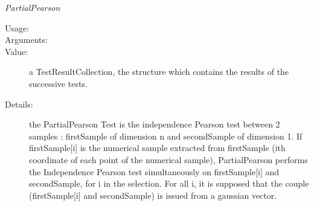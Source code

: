 \begin{description}
\begin{description}
\item \textit{PartialPearson}
\begin{description}
\item[Usage:] \rule{0pt}{1em}
\item[Arguments:] \rule{0pt}{1em}
\item[Value:]  a TestResultCollection, the structure which contains the results of the successive tests.
\item[Details:] the PartialPearson Test is the independence Pearson test between 2 samples : firstSample of dimension n and secondSample of dimension 1. If firstSample[i] is the numerical sample extracted from firstSample (ith coordinate of each point of the numerical sample), PartialPearson performs the Independence Pearson test simultaneously on firstSample[i] and secondSample, for i in the selection. For all i, it is supposed that the couple (firstSample[i] and secondSample) is issued from a gaussian  vector.
\end{description}
\bigskip


\end{description}
\end{description}
